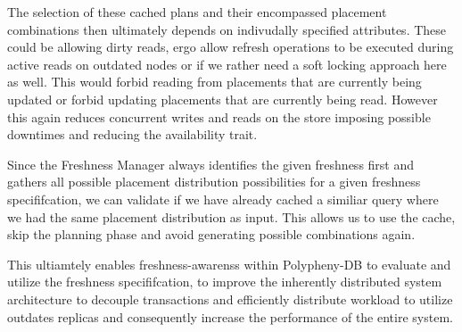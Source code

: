 The selection of these cached plans and their encompassed placement combinations then ultimately depends on indivudally specified attributes.
These could be allowing dirty reads, ergo allow refresh operations to be executed during active reads on outdated nodes or if we rather need a soft 
locking approach here as well. This would forbid reading from placements that are currently being updated or forbid updating placements that are currently being read.
However this again reduces concurrent writes and reads on the store imposing possible downtimes and reducing the availability trait.

Since the Freshness Manager always identifies the given freshness first and gathers all possible placement distribution possibilities for a given freshness specififcation, 
we can validate if we have already cached a similiar query where we had the same placement distribution as input. 
This allows us to use the cache, skip the planning phase and avoid generating possible combinations again. 

This ultiamtely enables freshness-awarenss within Polypheny-DB to evaluate and utilize the freshness specififcation, to improve the inherently distributed system 
architecture to decouple transactions and efficiently distribute workload to utilize outdates replicas and consequently increase the performance of the entire system.






